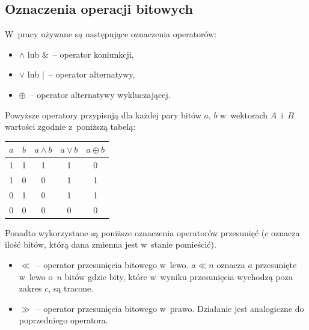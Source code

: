 \documentclass[12pt,a4paper,twoside]{article}
\begin{document}
\newpage
\begin{appendices}
\section{Oznaczenia operacji bitowych}
\label{app:bitwise_operations}

    W~pracy używane są następujące oznaczenia operatorów:

    \begin{itemize}
        \item $\land$ lub $\&$~-- operator koniunkcji,
        \item $\lor$ lub $|$~-- operator alternatywy,
        \item $\oplus$~-- operator alternatywy wykluczającej.
    \end{itemize}

    \noindent Powyższe operatory przypisują dla każdej pary bitów $a$, $b$
    w~wektorach $A$~i~$B$ wartości zgodnie z~poniższą tabelą:

    \begin{center}
        \begin{tabular}{ |c|c||c|c|c| }
            \hline
            $a$ & $b$ & $a \land b$ & $a \lor b$ & $a \oplus b$ \\
            \hline
            1 & 1 & 1 & 1 & 0 \\
            1 & 0 & 0 & 1 & 1 \\
            0 & 1 & 0 & 1 & 1 \\
            0 & 0 & 0 & 0 & 0 \\
            \hline
        \end{tabular}
    \end{center}

    \noindent Ponadto wykorzystane są poniższe oznaczenia operatorów przesunięć
    ($c$ oznacza ilość bitów, którą dana zmienna jest w~stanie pomieścić).

    \begin{itemize}

        \item $\ll$~-- operator przesunięcia bitowego w~lewo. $a \ll n$ oznacza
        $a$ przesunięte w~lewo o~$n$ bitów gdzie bity, które w~wyniku
        przesunięcia wychodzą poza zakres $c$, są tracone.

        \item $\gg$~-- operator przesunięcia bitowego w~prawo. Działanie jest
        analogiczne do poprzedniego operatora.


\end{itemize}
\end{appendices}
\end{document}
